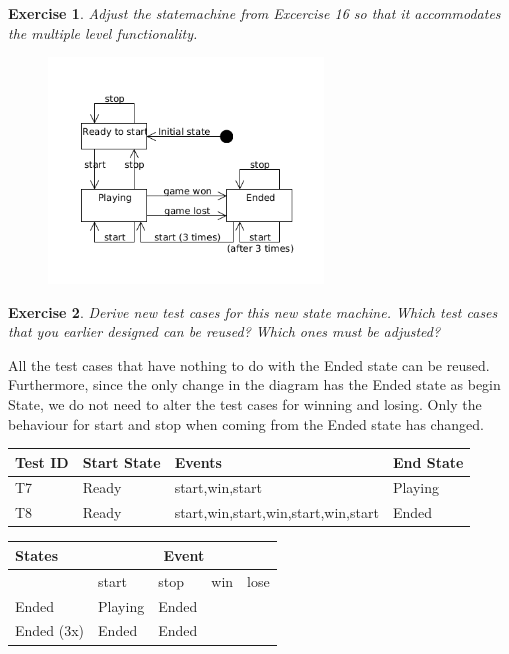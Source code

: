 \documentclass[a4paper]{article}
\newtheorem{thm}{Exercise}
\begin{document}
    \newpage
    \begin{thm}
      Adjust the statemachine from Excercise 16 so that it accommodates the multiple level functionality.
    \end{thm}
    \begin{figure}[htb]
      \includegraphics[height=6cm,keepaspectratio]{state-multi}
    \end{figure}

    \begin{thm}
      Derive new test cases for this new state machine.
      Which test cases that you earlier designed can be reused? Which ones must be adjusted?
    \end{thm}
    All the test cases that have nothing to do with the Ended state can be reused.
    Furthermore, since the only change in the diagram has the Ended state as begin State,
    we do not need to alter the test cases for winning and losing.
    Only the behaviour for start and stop when coming from the Ended state has changed.
    \begin{table}[h]
      \begin{tabular}{|l|l|l|l|}
        \hline
        Test ID & Start State & Events                                  & End State \\ \hline
        T7      & Ready       & start,win,start                         & Playing   \\ \hline
        T8      & Ready       & start,win,start,win,start,win,start     & Ended     \\ \hline
      \end{tabular}
    \end{table}
    \begin{table}[h]
      \begin{tabular}{|l|l|l|l|l|}
        \hline
        States     & \multicolumn{4}{|c|}{Event}        \\ \hline
                   & start   & stop    & win    & lose  \\ \hline
        Ended      & Playing & Ended   &        &       \\ \hline
        Ended (3x) & Ended   & Ended   &        &       \\ \hline
      \end{tabular}
    \end{table}
    
\end{document}
